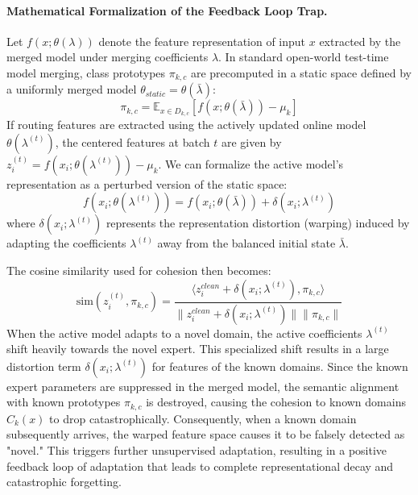 \documentclass{article}
\theoremstyle{plain}
\theoremstyle{definition}
\theoremstyle{remark}
\begin{document}
\paragraph{Mathematical Formalization of the Feedback Loop Trap.}
Let $f(x; \theta(\lambda))$ denote the feature representation of input $x$ extracted by the merged model under merging coefficients $\lambda$. In standard open-world test-time model merging, class prototypes $\pi_{k,c}$ are precomputed in a static space defined by a uniformly merged model $\theta_{static} = \theta(\bar{\lambda})$:
\begin{equation}
    \pi_{k,c} = \mathbb{E}_{x \in D_{k,c}} [f(x; \theta(\bar{\lambda})) - \mu_k]
\end{equation}
If routing features are extracted using the actively updated online model $\theta(\lambda^{(t)})$, the centered features at batch $t$ are given by $z_i^{(t)} = f(x_i; \theta(\lambda^{(t)})) - \mu_k$. We can formalize the active model's representation as a perturbed version of the static space:
\begin{equation}
    f(x_i; \theta(\lambda^{(t)})) = f(x_i; \theta(\bar{\lambda})) + \delta(x_i; \lambda^{(t)})
\end{equation}
where $\delta(x_i; \lambda^{(t)})$ represents the representation distortion (warping) induced by adapting the coefficients $\lambda^{(t)}$ away from the balanced initial state $\bar{\lambda}$.

The cosine similarity used for cohesion then becomes:
\begin{equation}
    \text{sim}(z_i^{(t)}, \pi_{k,c}) = \frac{\langle z_i^{clean} + \delta(x_i; \lambda^{(t)}), \pi_{k,c} \rangle}{\|z_i^{clean} + \delta(x_i; \lambda^{(t)})\| \|\pi_{k,c}\|}
\end{equation}
When the active model adapts to a novel domain, the active coefficients $\lambda^{(t)}$ shift heavily towards the novel expert. This specialized shift results in a large distortion term $\delta(x_i; \lambda^{(t)})$ for features of the known domains. Since the known expert parameters are suppressed in the merged model, the semantic alignment with known prototypes $\pi_{k,c}$ is destroyed, causing the cohesion to known domains $C_k(x)$ to drop catastrophically. Consequently, when a known domain subsequently arrives, the warped feature space causes it to be falsely detected as "novel." This triggers further unsupervised adaptation, resulting in a positive feedback loop of adaptation that leads to complete representational decay and catastrophic forgetting.
\end{document}
